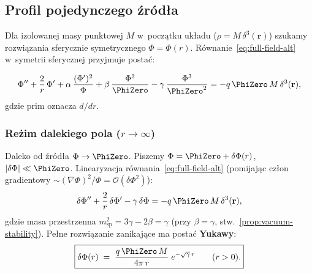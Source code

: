 \subsection{Profil pojedynczego \'zr\'od\l{}a}\label{ssec:profil-wyp}

Dla izolowanej masy punktowej $M$ w~pocz\k{a}tku uk\l{}adu
($\rho = M\,\delta^3(\mathbf{r})$) szukamy rozwi\k{a}zania
sferycznie symetrycznego $\Phi = \Phi(r)$.
R\'ownanie~\eqref{eq:full-field-alt} w~symetrii sferycznej
przyjmuje posta\'c:

\begin{equation}\label{eq:spher}
  \Phi'' + \frac{2}{r}\,\Phi'
  + \alpha\,\frac{(\Phi')^2}{\Phi}
  + \beta\,\frac{\Phi^2}{\PhiZero}
  - \gamma\,\frac{\Phi^3}{\PhiZero^2}
  = -q\,\PhiZero\,M\,\delta^3(\mathbf{r}),
\end{equation}
gdzie prim oznacza $d/dr$.

\subsubsection{Re\.zim dalekiego pola ($r \to \infty$)}

Daleko od \'zr\'od\l{}a $\Phi \to \PhiZero$. Piszemy
$\Phi = \PhiZero + \delta\Phi(r)$, $|\delta\Phi| \ll \PhiZero$.
Linearyzacja r\'ownania~\eqref{eq:full-field-alt}
(pomijaj\k{a}c cz\l{}on gradientowy $\sim (\nabla\Phi)^2/\Phi
= \mathcal{O}(\delta\Phi^2)$):
\begin{equation}\label{eq:far-field-eq}
  \delta\Phi'' + \frac{2}{r}\,\delta\Phi'
  - \gamma\,\delta\Phi
  = -q\,\PhiZero\,M\,\delta^3(\mathbf{r}),
\end{equation}
gdzie masa przestrzenna $m_{\mathrm{sp}}^2 = 3\gamma - 2\beta = \gamma$
(przy $\beta = \gamma$, stw.~\ref{prop:vacuum-stability}).
Pe\l{}ne rozwi\k{a}zanie zanikaj\k{a}ce ma posta\'c \textbf{Yukawy}:
\begin{equation}\label{eq:far-field}
  \boxed{
    \delta\Phi(r)
    \;=\; \frac{q\,\PhiZero\,M}{4\pi\,r}\;
    e^{-\sqrt{\gamma}\,r}
    \qquad (r > 0).
  }
\end{equation}

